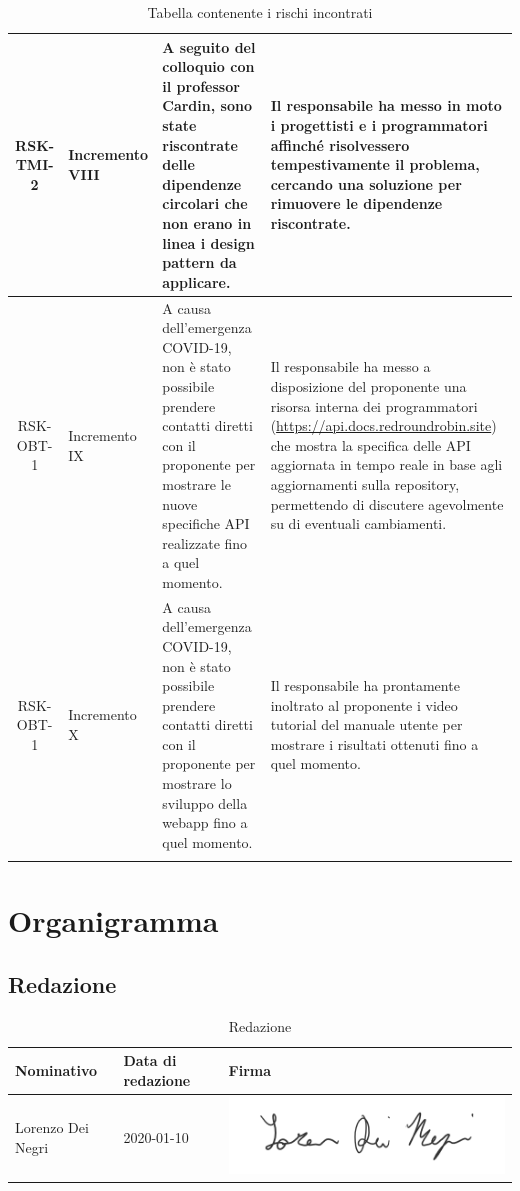 \begin{center}
\begin{longtable}{|c|p{3cm}|p{4cm}|p{4cm}|}
			\hline
			RSK-TMI-2 & Incremento VIII & A seguito del colloquio con il professor Cardin, sono state riscontrate delle dipendenze circolari che non erano in linea i design pattern da applicare. & Il responsabile ha messo in moto i progettisti e i programmatori affinché risolvessero tempestivamente il problema, cercando una soluzione per rimuovere le dipendenze riscontrate. \\
			\hline
			RSK-OBT-1 & Incremento IX & A causa dell'emergenza COVID-19, non è stato possibile prendere contatti diretti con il proponente per mostrare le nuove specifiche API realizzate fino a quel momento. & Il responsabile ha messo a disposizione del proponente una risorsa interna dei programmatori (\href{api.docs.redroundrobin.site}{https://api.docs.redroundrobin.site}) che mostra la specifica delle API aggiornata in tempo reale in base agli aggiornamenti sulla repository, permettendo di discutere agevolmente su \glock{Slack} di eventuali cambiamenti. \\
			\hline
			RSK-OBT-1 & Incremento X & A causa dell'emergenza COVID-19, non è stato possibile prendere contatti diretti con il proponente per mostrare lo sviluppo della webapp fino a quel momento. & Il responsabile ha prontamente inoltrato al proponente i video tutorial del manuale utente per mostrare i risultati ottenuti fino a quel momento. \\
			\hline

			\caption{Tabella contenente i rischi incontrati}
			\end{longtable}
		\end{center}

	\section{Organigramma}
		
		\subsection{Redazione}
			
			\begin{table}[!h]
				\centering
					\begin{tabular}{|l|l|l|}
						\hline
						\textbf{Nominativo} & \textbf{Data di redazione} & \textbf{Firma} \\ \hline
						Lorenzo Dei Negri & 2020-01-10 &  \includegraphics[scale=0.6]{images/firme/lorenzo} \\ \hline
					\end{tabular}
				\caption{Redazione}
			\end{table}
		
